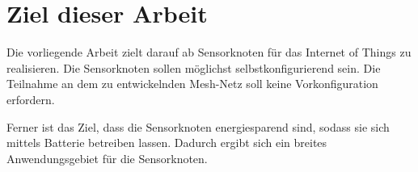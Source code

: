 \section{Ziel dieser Arbeit}
Die vorliegende Arbeit zielt darauf ab Sensorknoten für das Internet of Things zu realisieren. Die Sensorknoten sollen möglichst selbstkonfigurierend sein. Die Teilnahme an dem zu entwickelnden Mesh-Netz soll keine Vorkonfiguration erfordern. 

Ferner ist das Ziel, dass die Sensorknoten energiesparend sind, sodass sie sich mittels Batterie betreiben lassen. Dadurch ergibt sich ein breites Anwendungsgebiet für die Sensorknoten.